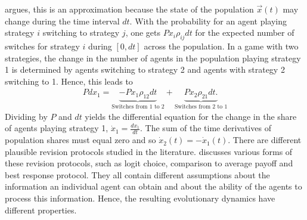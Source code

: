 \textcite{sandholm_population_2010} argues, this is an approximation because
the state of the population $\vec{x}(t)$ may change during the time interval $dt$.
With the probability for an agent playing strategy $i$ switching to strategy
$j$, one gets $P x_i \rho_{ij} dt$ for the expected number of 
switches for strategy $i$ during $[0,dt]$ across the population.   
In a game with two strategies, the change in the number 
of agents in the population playing strategy 1 is determined 
by agents switching to strategy 2 and agents with strategy 2 
switching to 1. Hence, this leads to
\begin{align} 
        Pdx_1 =  \underbrace{-Px_1 \rho_{12}dt}_{\text{Switches from 1 to 2}} 
        + \underbrace{Px_2 \rho_{21}dt.}_{\text{Switches from 2 to 1}}
\end{align}
Dividing by $P$ and $dt$ yields the differential equation for
the change in the share of agents playing strategy 1, 
$\dot{x}_1 =\frac{dx_1}{dt}$. 
The sum of the time derivatives of population shares must equal zero and so
$\dot{x}_2(t) =- \dot{x}_1(t)$.
There are different plausible revision protocols studied in the literature. 
\textcite{sandholm_population_2010} discusses various forms of 
these revision protocols, such as logit choice, comparison to average payoff 
and best response protocol. 
They all contain different assumptions about the information 
an individual agent can obtain and about the ability of the agents 
to process this information. Hence, the resulting evolutionary 
dynamics have different properties.

